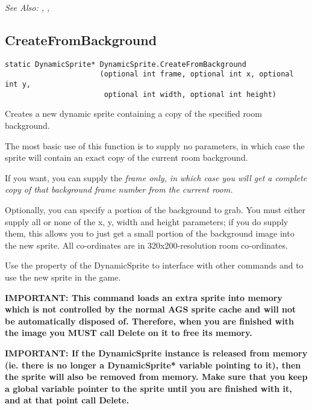 \it{See Also:} ,
,



\subsection{CreateFromBackground}\label{DynamicSprite.CreateFromBackground}%

\begin{verbatim}
static DynamicSprite* DynamicSprite.CreateFromBackground
                      (optional int frame, optional int x, optional int y,
                       optional int width, optional int height)
\end{verbatim}
Creates a new dynamic sprite containing a copy of the specified room background.

The most basic use of this function is to supply no parameters, in which case
the sprite will contain an exact copy of the current room background.

If you want, you can supply the \it{frame} only, in which case you will get a
complete copy of that background frame number from the current room.

Optionally, you can specify a portion of the background to grab. You must
either supply all or none of the x, y, width and height parameters; if you
do supply them, this allows you to just get a small portion of the background
image into the new sprite. All co-ordinates are in 320x200-resolution room co-ordinates.

Use the  property of the DynamicSprite to
interface with other commands and to use the new sprite in the game.

\bf{IMPORTANT:} This command loads an extra sprite into memory which is not controlled
by the normal AGS sprite cache and will not be automatically disposed of. Therefore, when
you are finished with the image you \bf{MUST} call Delete on it to free its memory.

\bf{IMPORTANT:} If the DynamicSprite instance is released from memory (ie. there is
no longer a DynamicSprite* variable pointing to it), then the sprite will also be
removed from memory. Make sure that you keep a global variable pointer to the sprite
until you are finished with it, and at that point call Delete.

